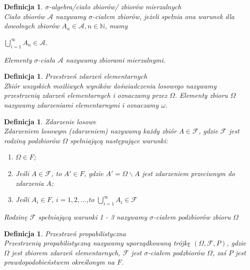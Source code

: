 \documentclass[12pt,a4paper]{report}
\newtheorem{definition}[theorem]{Definicja}
\begin{document}
\begin{definition}{$\sigma$-algebra/ciało zbiorów/ zbiorów mierzalnych\cite[Rozdział 8.1]{rudnicki2006}\\}
Ciało zbiorów $\mathcal{A}$ nazywamy $\sigma$-ciałem zbiorów, jeżeli spełnia ona warunek
dla dowolnych zbiorów $A_{n} \in \mathcal{A}, n \in \mathbb{N}$, mamy
\begin{center}
$\bigcup\limits_{i=1}^{\infty} A_n \in \mathcal{A}$.
\end{center}
Elementy $\sigma$-ciała $\mathcal{A}$ nazywamy zbiorami mierzalnymi.\\
\end{definition}

\begin{definition}{Przestrzeń zdarzeń elementarnych \cite[w oparciu o rozdział 1.1]{krysicki1999}\\}
Zbiór wszyskich możliwych wyników doświadczenia losowego nazywamy przestrzenią zdarzeń elementarnych i oznaczamy przez $\Omega$. Elementy zbioru $\Omega$ nazywamy zdarzeniami elementarnymi i oznaczamy $\omega$.\\
\end{definition}

\begin{definition}{Zdarzenie losowe \cite[w oparciu o rozdział 1.1]{krysicki1999}\\}
Zdarzeniem losowym (zdarzeniem) nazywamy każdy zbiór $\textit{A} \in \mathcal{F}$, gdzie $\mathcal{F}$ jest rodziną podzbiorów $\Omega$ spełniającą następujące warunki:
\begin{enumerate}
\item $\Omega \in F$;
\item Jeśli $A \in \mathcal{F}$, to $\textit{A$'$} \in \textit{F}$, gdzie $\textit{A$'$} = \Omega \backslash A $ jest zdarzeniem przeciwnym do zdarzenia $\textit{A}$;
\item Jeśli $\textit{A}_{i} \in \textit{F}$, $i= 1, 2, ...$,to $\bigcup\limits_{i=1}^{\infty} A_{i} \in \mathcal{F} $
\end{enumerate}
Rodzinę $\mathcal{F}$ spełniającą warunki 1 - 3 nazywamy $\sigma$-ciałem podzbiorów zbioru $\Omega$\\
\end{definition}

\begin{definition}{Przestrzeń propabilistyczna \cite[w oparciu o rozdział 1.2]{krysicki1999}\\}
Przestrzenią propabilistyczną nazywamy uporządkowaną trójkę $(\Omega, \mathcal{F}, P)$, gdzie $\Omega$ jest zbiorem zdarzeń elementarnych, $\mathcal{F}$ jest $\sigma$-ciałem podzbiorów $\Omega$, zaś $P$ jest prawdopodobieństwem określonym na $F$.\\
\end{definition}
\end{document}
